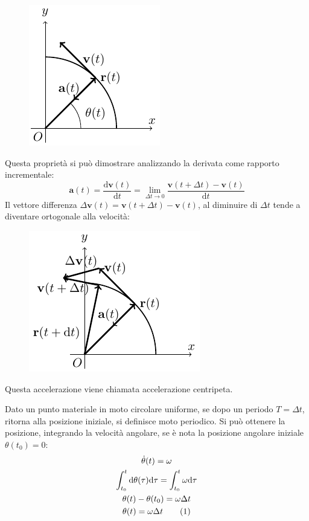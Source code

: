 \documentclass{article}
\newcommand{\vect}[1]{\boldsymbol{\mathbf{#1}}}
\newcommand{\df}{\mathrm{d}}
\numberwithin{equation}{subsection}
\begin{document}
\begin{figure}[H]%
    \centering
    \includegraphics{accelerazione-circolare-1.pdf}%
\end{figure}

Questa proprietà si può dimostrare analizzando la derivata come 
rapporto incrementale: 
\begin{equation*}
    \vect{a}(t)=\displaystyle\frac{\df\vect{v}(t)}{\df t}=\lim_{\Delta t \to 0}\frac{\vect{v}(t+\Delta t)-\vect{v}(t)}{\df t}
\end{equation*}
Il vettore differenza $\Delta \vect{v}(t) =\vect{v}(t+\Delta t)-\vect{v}(t)$, 
al diminuire di $\Delta t$ tende a diventare ortogonale alla velocità:

\begin{figure}[H]%
    \centering
    \includegraphics{accelerazione-circolare-2.pdf}%
\end{figure}

Questa accelerazione viene chiamata accelerazione centripeta.



Dato un punto materiale in moto circolare uniforme, se dopo un periodo 
$T=\Delta t$, ritorna alla posizione iniziale, si definisce moto 
periodico. Si può ottenere la posizione, integrando la velocità angolare, se è nota la posizione angolare iniziale  
$\theta(t_0) = 0$: 
\begin{gather*}
    \dot\theta(t) = \omega\\
    \int_{t_0}^{t}\df\theta(\tau)\df\tau=\int_{t_0}^{t}\omega \df\tau\\
    \theta(t)-\theta(t_0)=\omega\Delta t\\
    \theta(t)=\omega\Delta t\tag{\stepcounter{equation}\theequation}
\end{gather*}
\end{document}
